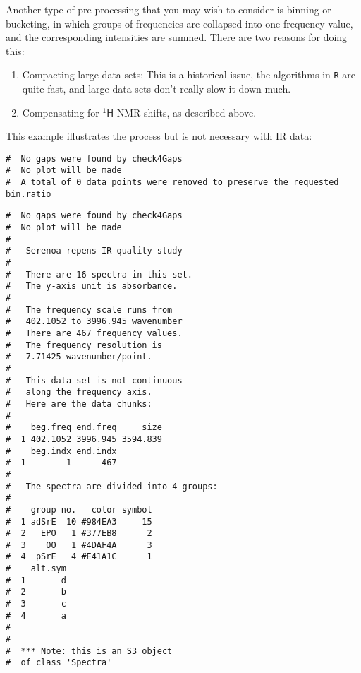 \documentclass[letter,10pt,twocolumn,twoside,printwatermark=false]{pinp}
\begin{document}
Another type of pre-processing that you may wish to consider is binning
or bucketing, in which groups of frequencies are collapsed into one
frequency value, and the corresponding intensities are summed. There are
two reasons for doing this:

\begin{enumerate}
  \item Compacting large data sets:  This is a historical issue, the algorithms in \texttt{R} are quite fast, and large data sets don't really slow it down much.
  \item  Compensating for $\mathsf{^{1}H}$ NMR shifts, as described above.
\end{enumerate}

This example illustrates the process but is not necessary with IR data:

\begin{Shaded}
\begin{Highlighting}[]
\StringTok{ } \NormalTok{)}
\end{Highlighting}
\end{Shaded}

\begin{ShadedResult}
\begin{verbatim}
#  No gaps were found by check4Gaps
#  No plot will be made
#  A total of 0 data points were removed to preserve the requested bin.ratio
\end{verbatim}
\end{ShadedResult}

\begin{Shaded}
\begin{Highlighting}[]
\end{Highlighting}
\end{Shaded}

\begin{ShadedResult}
\begin{verbatim}
#  No gaps were found by check4Gaps
#  No plot will be made
#  
#   Serenoa repens IR quality study 
#  
#   There are 16 spectra in this set.
#   The y-axis unit is absorbance.
#  
#   The frequency scale runs from
#   402.1052 to 3996.945 wavenumber
#   There are 467 frequency values.
#   The frequency resolution is
#   7.71425 wavenumber/point.
#  
#   This data set is not continuous
#   along the frequency axis.
#   Here are the data chunks:
#  
#    beg.freq end.freq     size
#  1 402.1052 3996.945 3594.839
#    beg.indx end.indx
#  1        1      467
#  
#   The spectra are divided into 4 groups: 
#  
#    group no.   color symbol
#  1 adSrE  10 #984EA3     15
#  2   EPO   1 #377EB8      2
#  3    OO   1 #4DAF4A      3
#  4  pSrE   4 #E41A1C      1
#    alt.sym
#  1       d
#  2       b
#  3       c
#  4       a
#  
#  
#  *** Note: this is an S3 object
#  of class 'Spectra'
\end{verbatim}
\end{ShadedResult}
\end{document}
